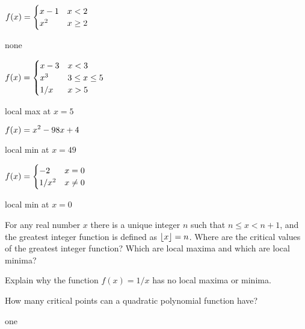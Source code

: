\begin{exercises}
\begin{exercise} $\displaystyle f(x) = \begin{cases} x-1 & x < 2  \\
x^2 & x\geq 2 \end{cases}$
\begin{answer} none
\end{answer}\end{exercise}

 \begin{exercise} $\displaystyle f(x) = \begin{cases} x-3 & x < 3  \\
x^3  & 3\leq x \leq 5 \\
1/x  & x>5 \end{cases}$
\begin{answer} local max at $x=5$
\end{answer}\end{exercise}

\begin{exercise} $\displaystyle f(x) = x^2 - 98x + 4$
\begin{answer} local min at $x=49$
\end{answer}\end{exercise}

\begin{exercise} $\displaystyle f(x) =\begin{cases} -2 & x = 0  \\
1/x^2 & x \neq 0 \end{cases}$
\begin{answer} local min at $x=0$
\end{answer}\end{exercise}

\endtwocol
\bsk
\begin{exercise}  For any real number $x$ there is a unique
  integer $n$ such that $n \leq x < n +1$, and the greatest
  integer function is defined as $\displaystyle\lfloor
  x\rfloor = n$. Where
  are the critical values of the greatest integer function?  Which are
  local maxima and which are local minima?
\end{exercise}

\begin{exercise} Explain why the function $f(x) =1/x$ has no local
maxima or minima.
\end{exercise}

\begin{exercise} How many critical points can a quadratic polynomial function have?
\begin{answer} one
\end{answer}\end{exercise}


\end{exercises}
